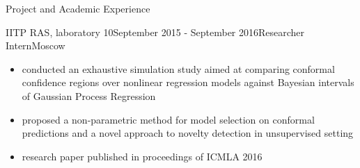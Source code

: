 \documentclass{resume} %
\begin{document}
\begin{rSection}{Project and Academic Experience}
\begin{rSubsection}{IITP RAS, laboratory 10}{September 2015 - September 2016}{Researcher Intern}{Moscow}
\begin{itemize}
        \item conducted an exhaustive simulation study aimed at comparing conformal
        confidence regions over nonlinear regression models against Bayesian intervals
        of Gaussian Process Regression

        \item proposed a non-parametric method for model selection on conformal predictions
        and a novel approach to novelty detection in unsupervised setting

        \item research paper published in proceedings of ICMLA 2016
    \end{itemize}
\end{rSubsection}

\end{rSection}
\end{document}
